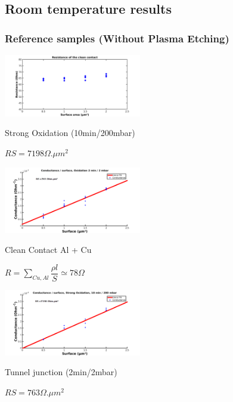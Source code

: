 \documentclass[handout]{beamer}
\begin{document}
        \subsection{Room temperature results}
    \begin{frame}
        \frametitle{Reference samples (Without Plasma Etching)}
        \begin{multicols}{2} 
            \includegraphics[width=60mm]{Rclean.png}\\
            \begin{small}
            \hfill Strong Oxidation (10min/200mbar)
            \vspace{1mm}
            
            \hfill $RS=7198 \Omega.\mu m^2$
            \end{small}
            \includegraphics[width=60mm]{ConductanceFitOx.png}

            \begin{small}
            
            
            Clean Contact Al + Cu\\
            \vspace{2mm}
            
            $R=\sum_{Cu,Al}\dfrac{\rho l}{S}\simeq 78 \Omega$\\
            \end{small}
            \vspace{4mm}
            
            \includegraphics[width=60mm]{ConductanceFitStrongOx.png}\\
            \vspace{3mm}
            
            \begin{small}
            Tunnel junction (2min/2mbar)\\
            \vspace{2mm}
            
            $RS=763 \Omega.\mu m^2$
            \end{small}
                
        \end{multicols}
                
    \end{frame}
    
\end{document}
